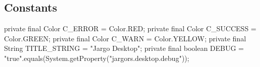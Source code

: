 \subsection{Constants}
\nwenddocs{}\endmoddef{}
private final Color C_ERROR   = Color.RED;
private final Color C_SUCCESS = Color.GREEN;
private final Color C_WARN    = Color.YELLOW;
private final String TITLE_STRING = "Jargo Desktop";
private final boolean DEBUG =
    "true".equals(System.getProperty("jargors.desktop.debug"));
\nwendcode{}\nwdocspar


